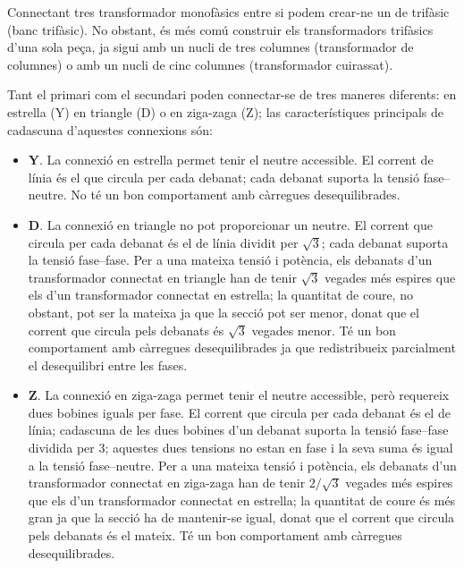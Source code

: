 Connectant tres transformador monofàsics entre si podem crear-ne un de trifàsic (banc trifàsic). No obstant, és més comú construir els transformadors trifàsics d'una sola peça, ja sigui amb un nucli de tres columnes (transformador de columnes) o amb un nucli de cinc columnes (transformador cuirassat).

Tant el primari com el secundari poden connectar-se de tres maneres diferents: en estrella (Y) en triangle (D) o en ziga-zaga (Z); las característiques principals de cadascuna d'aquestes connexions són:

\begin{itemize}
   \item \textbf{Y}. La connexió en estrella permet tenir el neutre accessible. El corrent de línia és el que circula per cada debanat; cada debanat suporta la tensió fase--neutre. No té un bon comportament amb càrregues desequilibrades.
   \item \textbf{D}. La connexió en triangle no pot proporcionar un neutre. El corrent que circula per cada debanat és el de línia dividit per $\sqrt{3}$; cada debanat suporta la tensió fase--fase. Per a una mateixa tensió i potència, els debanats d'un transformador connectat en triangle han de tenir $\sqrt{3}$ vegades més espires que els d'un transformador connectat en estrella; la quantitat de coure, no obstant, pot ser la mateixa ja que la secció pot ser menor, donat que el corrent que circula pels debanats és $\sqrt{3}$ vegades menor. Té un bon comportament amb càrregues desequilibrades ja que redistribueix parcialment el desequilibri entre les fases.
   \item \textbf{Z}. La connexió en ziga-zaga permet tenir el neutre accessible, però requereix dues bobines iguals per fase. El corrent que circula per cada debanat és el de línia; cadascuna de les dues bobines d'un debanat suporta la tensió fase--fase dividida per 3; aquestes dues tensions no estan en fase i la seva suma és igual a la tensió fase--neutre. Per a una mateixa tensió i potència, els debanats d'un transformador connectat en ziga-zaga han de tenir $2/\sqrt{3}$ vegades més espires que els d'un transformador connectat en estrella; la quantitat de coure és més gran ja que la secció ha de mantenir-se igual, donat que el corrent que circula pels debanats és el mateix. Té un bon comportament amb càrregues desequilibrades.
\end{itemize}

